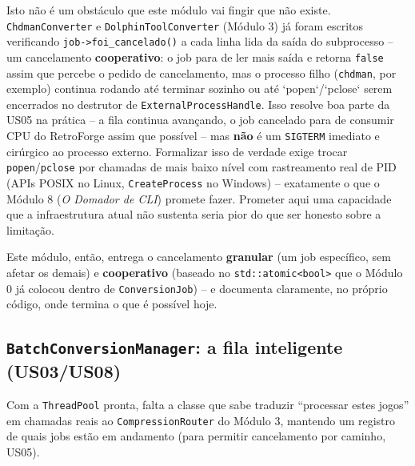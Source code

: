 \begin{CaixaAlerta}
Isto não é um obstáculo que este módulo vai fingir que não existe. \texttt{ChdmanConverter} e \texttt{DolphinToolConverter} (Módulo 3) já foram escritos verificando \texttt{job->foi\_cancelado()} a cada linha lida da saída do subprocesso -- um cancelamento \textbf{cooperativo}: o job para de ler mais saída e retorna \texttt{false} assim que percebe o pedido de cancelamento, mas o processo filho (\texttt{chdman}, por exemplo) continua rodando até terminar sozinho ou até `popen`/`pclose` serem encerrados no destrutor de \texttt{ExternalProcessHandle}. Isso resolve boa parte da US05 na prática -- a fila continua avançando, o job cancelado para de consumir CPU do RetroForge assim que possível -- mas \textbf{não} é um \texttt{SIGTERM} imediato e cirúrgico ao processo externo. Formalizar isso de verdade exige trocar \texttt{popen}/\texttt{pclose} por chamadas de mais baixo nível com rastreamento real de PID (APIs POSIX no Linux, \texttt{CreateProcess} no Windows) -- exatamente o que o Módulo 8 (\textit{O Domador de CLI}) promete fazer. Prometer aqui uma capacidade que a infraestrutura atual não sustenta seria pior do que ser honesto sobre a limitação.
\end{CaixaAlerta}

Este módulo, então, entrega o cancelamento \textbf{granular} (um job específico, sem afetar os demais) e \textbf{cooperativo} (baseado no \texttt{std::atomic<bool>} que o Módulo 0 já colocou dentro de \texttt{ConversionJob}) -- e documenta claramente, no próprio código, onde termina o que é possível hoje.

\subsection{\texttt{BatchConversionManager}: a fila inteligente (US03/US08)}
\label{sec:batch-manager}

Com a \texttt{ThreadPool} pronta, falta a classe que sabe traduzir ``processar estes jogos'' em chamadas reais ao \texttt{CompressionRouter} do Módulo 3, mantendo um registro de quais jobs estão em andamento (para permitir cancelamento por caminho, US05).

